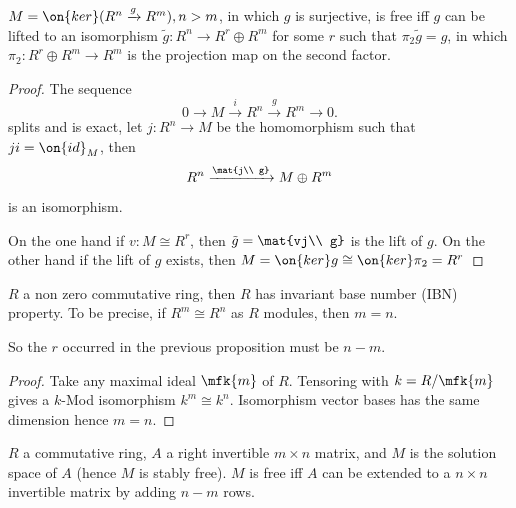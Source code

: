 \begin{prp}
	$M=\on{ker}(R^n\xrightarrow{g} R^m), n>m$, in which $g$ is surjective, is free iff $g$ can be lifted to an isomorphism $\tilde{g}:R^n\rightarrow R^r\oplus R^m$ for some $r$ such that $\pi_2\tilde{g}=g$, in which $\pi_2:R^r\oplus R^m\rightarrow R^m$ is the projection map on the second factor.
\end{prp}
\begin{proof}
	The sequence
	$$
	0\rightarrow M\xrightarrow{i} R^n\xrightarrow{g} R^m\rightarrow 0.
	$$
	splits and is exact, let $j:R^n\rightarrow M$ be the homomorphism such that $ji=\on{id}_M$, then
	$$
	R^n\xrightarrow{\mat{j\\ g}}M\oplus R^m
	$$
	is an isomorphism.
	
	On the one hand if $v:M\cong R^r$, then $\tilde{g}=\mat{vj\\ g}$ is the lift of $g$. On the other hand if the lift of $g$ exists, then $M=\on{ker}g\cong\on{ker}\pi_2=R^r$
\end{proof}

\begin{lem}
	$R$ a non zero commutative ring, then $R$ has invariant base number (IBN) property. To be precise, if $R^m\cong R^n$ as $R$ modules, then $m=n$.
\end{lem}
\begin{rmk}
	So the $r$ occurred in the previous proposition must be $n-m$.
\end{rmk}
\begin{proof}
	Take any maximal ideal $\mfk{m}$ of $R$. Tensoring with $k=R/\mfk{m}$ gives a $k$-Mod isomorphism $k^m\cong k^n$. Isomorphism vector bases has the same dimension hence $m=n$.
\end{proof}

\begin{cor}\label{cor:matrix}
	$R$ a commutative ring, $A$ a right invertible $m\times n$ matrix, and $M$ is the solution space of $A$ (hence $M$ is stably free). $M$ is free iff $A$ can be extended to a $n\times n$ invertible matrix by adding $n-m$ rows.
\end{cor}

